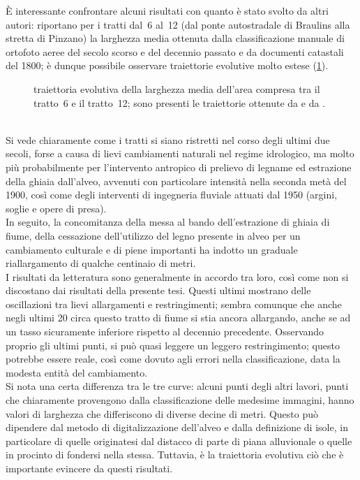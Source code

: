 È interessante confrontare alcuni risultati con quanto è stato svolto da altri autori:  riportano per i tratti dal~6 al~12 (dal ponte autostradale di Braulins alla stretta di Pinzano) la larghezza media ottenuta dalla classificazione manuale di ortofoto aeree del secolo scorso e del decennio passato e da documenti catastali del 1800; è dunque possibile osservare traiettorie evolutive molto estese (\cref{graph:larghezze-vs-letteratura}).
%
\begin{figure}
	\centering
	
	\caption[traiettoria evolutiva della larghezza media dell'area compresa tra il tratto~6 e il tratto~12]{traiettoria evolutiva della larghezza media dell'area compresa tra il tratto~6 e il tratto~12; sono presenti le traiettorie ottenute da  e da .}
	\label{graph:larghezze-vs-letteratura}
\end{figure}
%
\\
Si vede chiaramente come i tratti si siano ristretti nel corso degli ultimi due secoli, forse a causa di lievi cambiamenti naturali nel regime idrologico, ma molto più probabilmente per l'intervento antropico di prelievo di legname ed estrazione della ghiaia dall'alveo, avvenuti con particolare intensità nella seconda metà del 1900, così come degli interventi di ingegneria fluviale attuati dal 1950 (argini, soglie e opere di presa).
\\
In seguito, la concomitanza della messa al bando dell'estrazione di ghiaia di fiume, della cessazione dell'utilizzo del legno presente in alveo per un cambiamento culturale e di piene importanti ha indotto un graduale riallargamento di qualche centinaio di metri.
\\
I risultati da letteratura sono generalmente in accordo tra loro, così come non si discostano dai risultati della presente tesi.
Questi ultimi mostrano delle oscillazioni tra lievi allargamenti e restringimenti; sembra comunque che anche negli ultimi \SI{20}{\anni} circa questo tratto di fiume si stia ancora allargando, anche se ad un tasso sicuramente inferiore rispetto al decennio precedente.
Osservando proprio gli ultimi punti, si può quasi leggere un leggero restringimento; questo potrebbe essere reale, così come dovuto agli errori nella classificazione, data la modesta entità del cambiamento.
\\
Si nota una certa differenza tra le tre curve: alcuni punti degli altri lavori, punti che chiaramente provengono dalla classificazione delle medesime immagini, hanno valori di larghezza che differiscono di diverse decine di metri.
Questo può dipendere dal metodo di digitalizzazione dell'alveo e dalla definizione di isole, in particolare di quelle originatesi dal distacco di parte di piana alluvionale o quelle in procinto di fondersi nella stessa.
Tuttavia, è la traiettoria evolutiva ciò che è importante evincere da questi risultati.
